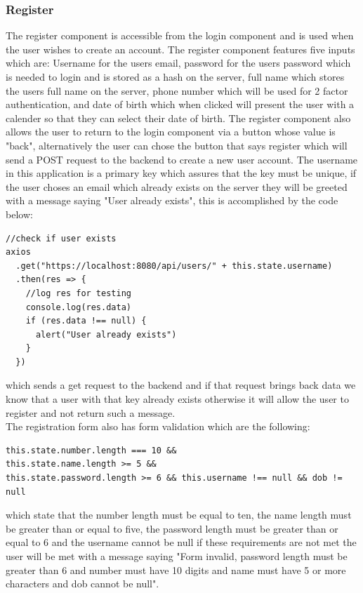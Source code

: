\subsubsection{Register}
The register component is accessible from the login component and is used when the
user wishes to create an account.  The register component features five inputs which
are: Username for the users email, password for the users password which is needed to login and is stored as a hash on the server,
full name which stores the users full name on the server, phone number which will be used for
2 factor authentication, and date of birth which when clicked will present the user with a calender
so that they can select their date of birth.  The register component also allows the user to return
to the login component via a button whose value is "back", alternatively the user can chose the button that
says register which will send a POST request to the backend to create a new user account.  The username
in this application is a primary key which assures that the key must be unique, if the user choses an
email which already exists on the server they will be greeted with a message saying "User already exists",
this is accomplished by the code below:
\begin{verbatim}
//check if user exists
axios
  .get("https://localhost:8080/api/users/" + this.state.username)
  .then(res => {
    //log res for testing
    console.log(res.data)
    if (res.data !== null) {
      alert("User already exists")
    }
  })
\end{verbatim}
which sends a get request to the backend and if that request brings back data we know that a
user with that key already exists otherwise it will allow the user to register and not return such
a message.
\\
The registration form also has form validation which are the following:
\begin{verbatim}
this.state.number.length === 10 &&
this.state.name.length >= 5 &&
this.state.password.length >= 6 && this.username !== null && dob != null
\end{verbatim}
which state that the number length must be equal to ten, the name length must be greater than or equal to five, the password length must be greater than or equal to 6 and the username cannot be null if these requirements are not met the user will be met with a message saying "Form invalid, password length must be greater than 6 and number must have 10 digits and  name must have 5 or more characters and dob cannot be null".

